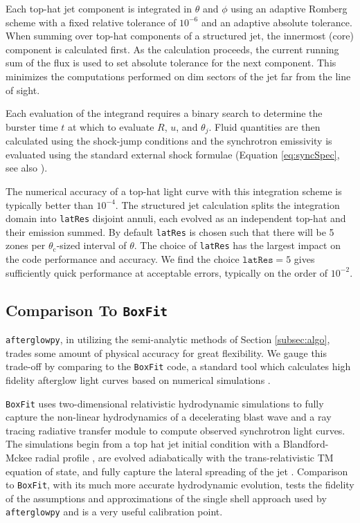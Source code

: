 \documentclass[twocolumn]{aastex62}
\newcommand{\afterglowpy}{{\tt afterglowpy}}
\newcommand{\boxfit}{{\tt BoxFit}}
\newcommand{\thC}{\ensuremath{\theta_{\mathrm{c}}}}
\begin{document}
Each top-hat jet component is integrated in $\theta$ and $\phi$ using an adaptive Romberg scheme with a fixed relative tolerance of $10^{-6}$ and an adaptive absolute tolerance.  When summing over top-hat components of a structured jet, the innermost (core) component is calculated first.  As the calculation proceeds, the current running sum of the flux is used to set absolute tolerance for the next component.  This minimizes the computations performed on dim sectors of the jet far from the line of sight.

Each evaluation of the integrand requires a binary search to determine the burster time $t$ at which to evaluate $R$, $u$, and $\theta_j$.  Fluid quantities are then calculated using the shock-jump conditions and the synchrotron emissivity is evaluated using the standard external shock formulae (Equation \eqref{eq:syncSpec}, see also \citet{Granot:2002aa,van-Eerten:2010aa}).  

The numerical accuracy of a top-hat light curve with this integration scheme is typically better than $10^{-4}$.  The structured jet calculation splits the integration domain into {\tt latRes} disjoint annuli, each evolved as an independent top-hat and their emission summed.  By default {\tt latRes} is chosen such that there will be 5 zones per $\thC$-sized interval of $\theta$.   The choice of  {\tt latRes} has the largest impact on the code performance and accuracy.  We find the choice $\mathtt{latRes} = 5$ gives sufficiently quick performance at acceptable errors, typically on the order of $10^{-2}$. 


\subsection{Comparison To \boxfit{}} \label{subsec:boxfitcomp}

\afterglowpy{}, in utilizing the semi-analytic methods of Section \ref{subsec:algo}, trades some amount of physical accuracy for great flexibility.  We gauge this trade-off by comparing to the \boxfit{} code, a standard tool which calculates high fidelity afterglow light curves based on numerical simulations \citep{van-Eerten:2012ab}.  

\boxfit{} uses two-dimensional relativistic hydrodynamic simulations to fully capture the non-linear hydrodynamics of a decelerating blast wave and a ray tracing radiative transfer module to compute observed synchrotron light curves.  The simulations begin from a top hat jet initial condition with a Blandford-Mckee radial profile \citep{Blandford:1976aa}, are evolved adiabatically with the trans-relativistic TM equation of state, and fully capture the lateral spreading of the jet \citep{van-Eerten:2012ab}.  Comparison to \boxfit{}, with its much more accurate hydrodynamic evolution, tests the fidelity of the assumptions and approximations of the single shell approach used by \afterglowpy{} and is a very useful calibration point.  
\end{document}
